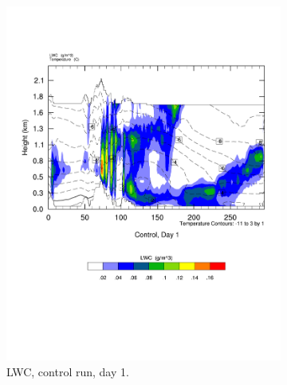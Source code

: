 \begin{figure}[h]
    \centering
    \begin{subfigure}{0.48\textwidth}
        \centering
        \includegraphics[width=\textwidth]{results/crossSec_LWC_Control_Day1.pdf}
        \caption{LWC, control run, day 1.}
        \label{subfig:cross_LWC_day1}
    \end{subfigure}
    \begin{subfigure}{0.48\textwidth}
        \centering

\end{subfigure}
\end{figure}
